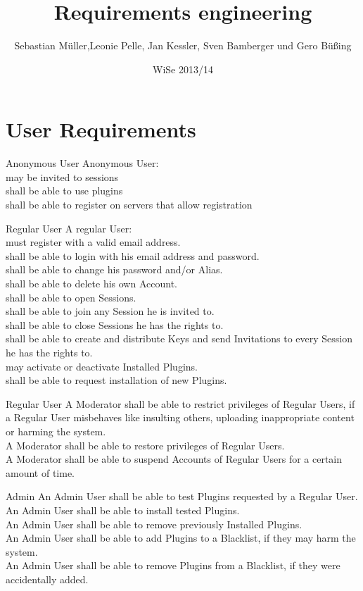 \documentclass[8pt]{beamer}
\title[Kurztitel]{Requirements engineering}
\author{Sebastian M\"uller,Leonie Pelle, Jan Kessler, Sven Bamberger und Gero B\"u\ss{}ing}
\date{WiSe 2013/14}
\begin{document}
\thispagestyle{empty}

\begin{frame}
  \titlepage
\end{frame}
\section{User Requirements}

\begin{frame}{Anonymous User}
Anonymous User:\\\pause
may be invited to sessions\\\pause
shall be able to use plugins\\\pause
shall be able to register on servers that allow registration
\end{frame}

\begin{frame}{Regular User}
A regular User:
\\\pause must register with a valid email address.
\\\pause shall be able to login with his email address and password.
\\\pause shall be able to change his password and/or Alias.
\\\pause shall be able to delete his own Account.
\\\pause shall be able to open Sessions.
\\\pause shall be able to join any Session he is invited to.
\\\pause shall be able to close Sessions he has the rights to.
\\\pause shall be able to create and distribute Keys and send Invitations to every Session he has the rights to.
\\\pause may activate or deactivate Installed Plugins.
\\\pause shall be able to request installation of new Plugins.
\end{frame}
\begin{frame}{Regular User}
A Moderator shall be able to restrict privileges of Regular Users, if
a Regular User misbehaves like insulting others, uploading inappropriate
content or harming the system.
\\\pause A Moderator shall be able to restore privileges of Regular Users.
\\\pause A Moderator shall be able to suspend Accounts of Regular Users
for a certain amount of time.
\end{frame}
\begin{frame}{Admin}
 An Admin User shall be able to test Plugins requested by a Regular User.
\\\pause An Admin User shall be able to install tested Plugins.
\\\pause An Admin User shall be able to remove previously Installed Plugins.
\\\pause An Admin User shall be able to add Plugins to a Blacklist, if they
may harm the system.
\\\pause An Admin User shall be able to remove Plugins from a Blacklist,
if they were accidentally added.
\end{frame}
\end{document}

